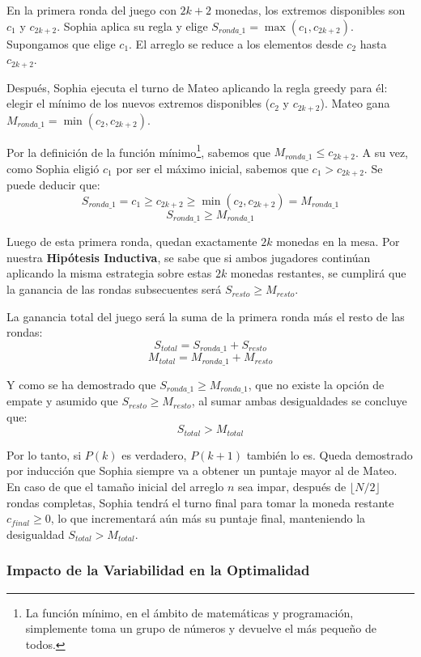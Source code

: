 En la primera ronda del juego con $2k + 2$ monedas, los extremos disponibles son $c_1$ y $c_{2k+2}$.
Sophia aplica su regla y elige $S_{ronda\_1} = \max(c_1, c_{2k+2})$. 
Supongamos que elige $c_1$. El arreglo se reduce a los elementos desde $c_2$ hasta $c_{2k+2}$.

Después, Sophia ejecuta el turno de Mateo aplicando la regla greedy para él: elegir el mínimo de los nuevos extremos disponibles ($c_2$ y $c_{2k+2}$).
Mateo gana $M_{ronda\_1} = \min(c_2, c_{2k+2})$.

Por la definición de la función mínimo\footnote{La función mínimo, en el ámbito de matemáticas y programación, simplemente toma un grupo de números y devuelve el más pequeño de todos.}, sabemos que $M_{ronda\_1} \le c_{2k+2}$. 
A su vez, como Sophia eligió $c_1$ por ser el máximo inicial, sabemos que $c_1 > c_{2k+2}$.
Se puede deducir que:
\[ S_{ronda\_1} = c_1 \ge c_{2k+2} \ge \min(c_2, c_{2k+2}) = M_{ronda\_1} \]
\[ S_{ronda\_1} \ge M_{ronda\_1} \]

Luego de esta primera ronda, quedan exactamente $2k$ monedas en la mesa. Por nuestra \textbf{Hipótesis Inductiva}, se sabe que si ambos jugadores continúan aplicando la misma estrategia sobre estas $2k$ monedas restantes, se cumplirá que la ganancia de las rondas subsecuentes será $S_{resto} \ge M_{resto}$.

La ganancia total del juego será la suma de la primera ronda más el resto de las rondas:
\[ S_{total} = S_{ronda\_1} + S_{resto} \]
\[ M_{total} = M_{ronda\_1} + M_{resto} \]

Y como se ha demostrado que $S_{ronda\_1} \ge M_{ronda\_1}$, que no existe la opción de empate y asumido que $S_{resto} \ge M_{resto}$, al sumar ambas desigualdades se concluye que:
\[ S_{total} > M_{total} \]

Por lo tanto, si $P(k)$ es verdadero, $P(k+1)$ también lo es. Queda demostrado por inducción que Sophia siempre va a obtener un puntaje mayor al de Mateo. En caso de que el tamaño inicial del arreglo $n$ sea impar, después de $\lfloor N/2 \rfloor$ rondas completas, Sophia tendrá el turno final para tomar la moneda restante $c_{final} \ge 0$, lo que incrementará aún más su puntaje final, manteniendo la desigualdad $S_{total} > M_{total}$.

\subsubsection{Impacto de la Variabilidad en la Optimalidad}

